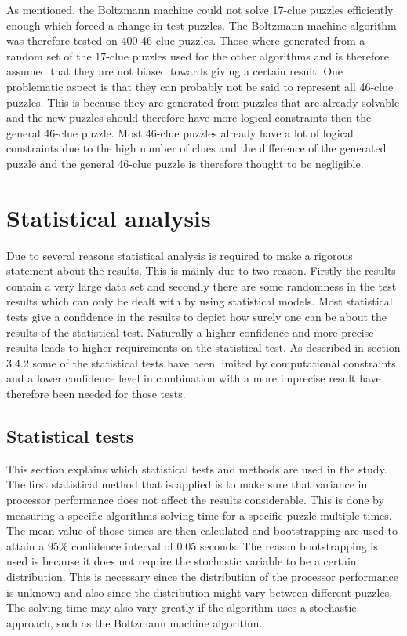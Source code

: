\documentclass[a4paper,11pt]{kth-mag}
\begin{document}
As mentioned, the Boltzmann machine could not solve 17-clue puzzles efficiently enough which forced a change in test puzzles. The Boltzmann machine algorithm was therefore tested on 400 46-clue puzzles. Those where generated from a random set of the 17-clue puzzles used for the other algorithms and is therefore assumed that they are not biased towards giving a certain result.
One problematic aspect is that they can probably not be said to represent all 46-clue puzzles.
This is because they are generated from puzzles that are already solvable and the new puzzles should therefore have more logical constraints then the general 46-clue puzzle.
Most 46-clue puzzles already have a lot of logical constraints due to the high number of clues and the difference of the generated puzzle and the general 46-clue puzzle is therefore thought to be negligible.
\FloatBarrier
\section{Statistical analysis}
\label{sec:statisticalAnalysis}
Due to several reasons statistical analysis is required to make a rigorous statement about the results. 
This is mainly due to two reason.
Firstly the results contain a very large data set and secondly there are some randomness in the test results which can only be dealt with by using statistical models. 
Most statistical tests give a confidence in the results to depict how surely one can be about the results of the statistical test. Naturally a higher confidence and more precise results leads to higher requirements on the statistical test. As described in section 3.4.2 some of the statistical tests have been limited by computational constraints and a lower confidence level in combination with a more imprecise result have therefore been needed for those tests.

\FloatBarrier
\subsection{Statistical tests}
\label{sec:statisticalTests}
This section explains which statistical tests and methods are used in the study.
The first statistical method that is applied is to make sure that variance in processor performance does not affect the results considerable. 
This is done by measuring a specific algorithms solving time for a specific puzzle multiple times. 
The mean value of those times are then calculated and bootstrapping are used to attain a 95\% confidence interval of 0.05 seconds. 
The reason bootstrapping is used is because it does not require the stochastic variable to be a certain distribution. 
This is necessary since the distribution of the processor performance is unknown and also since the distribution might vary between different puzzles. The solving time may also vary greatly if the algorithm uses a stochastic approach, such as the Boltzmann machine algorithm.
\end{document}
